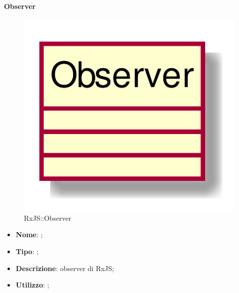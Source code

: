 \hypertarget{Observer_label}{\paragraph{Observer}}
\begin{figure}[h]
	\centering
	\includegraphics[width=\textwidth,height=\textheight,keepaspectratio]{images/ClassObserver.png}
	\caption{RxJS::Observer}
\end{figure}
\begin{itemize}
	\item \textbf{Nome}: ;
	\item \textbf{Tipo}: ;
	\item \textbf{Descrizione}: observer di RxJS;
	\item \textbf{Utilizzo}: ;
\end{itemize}
\FloatBarrier

